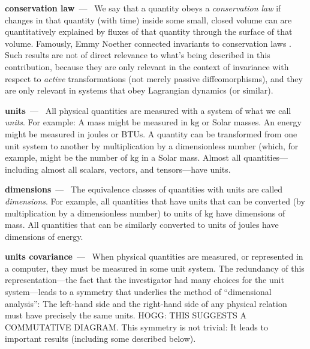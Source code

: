 \documentclass{article}
\newcommand{\unit}[1]{\mathrm{#1}}
\newcommand{\kg}{\unit{kg}}
\renewcommand{\paragraph}[1]{\par\textbf{#1}~---~}
\begin{document}
\paragraph{conservation law}
We say that a quantity obeys a \emph{conservation law} if changes in that quantity (with time) inside some small, closed volume can are quantitatively explained by fluxes of that quantity through the surface of that volume.
Famously, Emmy Noether connected invariants to conservation laws \cite{noether}.
Such results are not of direct relevance to what's being described in this contribution, because they are only relevant in the context of invariance with respect to \emph{active} transformations (not merely passive diffeomorphisms), and they are only relevant in systems that obey Lagrangian dynamics (or similar).

\paragraph{units} All physical quantities are measured with a system of what we call \emph{units}.
For example: A mass might be measured in $\kg$ or Solar masses.
An energy might be measured in joules or BTUs.
A quantity can be transformed from one unit system to another by multiplication by a dimensionless number (which, for example, might be the number of $\kg$ in a Solar mass.
Almost all quantities---including almost all scalars, vectors, and tensors---have units.

\paragraph{dimensions} The equivalence classes of quantities with units are called \emph{dimensions}.
For example, all quantities that have units that can be converted (by multiplication by a dimensionless number) to units of $\kg$ have dimensions of mass.
All quantities that can be similarly converted to units of joules have dimensions of energy.

\paragraph{units covariance} When physical quantities are measured, or represented in a computer, they must be measured in some unit system.
The redundancy of this representation---the fact that the investigator had many choices for the unit system---leads to a symmetry that underlies the method of ``dimensional analysis'':
The left-hand side and the right-hand side of any physical relation must have precisely the same units.
HOGG: THIS SUGGESTS A COMMUTATIVE DIAGRAM.
This symmetry is not trivial: It leads to important results (including some described below).
\end{document}
